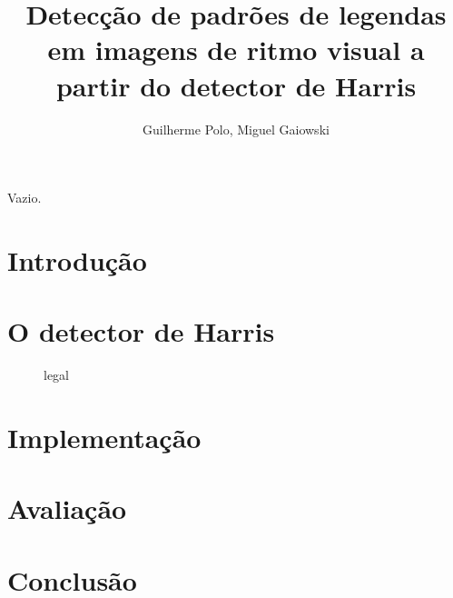 \documentclass[12pt]{article}
\title{Detecção de padrões de legendas em imagens de ritmo visual a partir
do detector de Harris}
\author{Guilherme Polo\inst{1}, Miguel Gaiowski\inst{1}}
\begin{document}
\maketitle

\begin{resumo}
  Vazio.
\end{resumo}


\section{Introdução}

\cite{harris}


\section{O detector de Harris}

\begin{figure}[h]
  \centering
  \quad
  \caption{legal}
\end{figure}


\section{Implementação}

\section{Avaliação}

\section{Conclusão}




\end{document}
